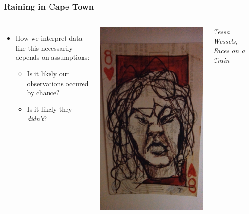 \documentclass{beamer}
\begin{document}
\begin{frame}


\frametitle{Raining in Cape Town}

\begin{columns}[c]  \small\begin{itemize}

\item How we interpret data like this necessarily depends on assumptions:\begin{itemize}

\item Is it likely our observations occured by chance?

\item Is it likely they \emph{didn't}?\end{itemize}\end{itemize}


\hfill\includegraphics[height=0.8\textheight]{eight.jpg}\hfill\mbox{}

{\small\emph{Tessa Wessels, {\em Faces on a Train}}}

\end{columns}
\end{frame}
\end{document}
